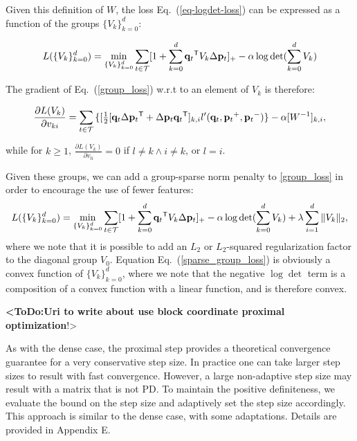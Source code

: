 \documentclass[twoside,11pt]{article}
\newcommand\todo[1]{\textbf{<ToDo:#1}!>}
\newcommand\mat[1]{{#1}}
\renewcommand\vec[1]{\mathbf{#1}}
\newcommand{\T}{{}^\mathsf{T}}
\newcommand{\W}{\mat{W}}
\newcommand{\q}{{\vec{q}}}
\newcommand{\p}{{\vec{p}}}
\newcommand{\trip}{{t}}
\newcommand{\qt}{{\q_{\trip}}}
\newcommand{\pt}{{\p_{\trip}}}
\newcommand{\triplet}{(\qt, \pt^{+}, \pt^{-})}
\newcommand{\Vk}{\mat{V_k}}
\newcommand{\Vg}{\{\Vk\}_{k=0}^{d}} %
\renewcommand{\eqref}[1]{Eq.~(\ref{#1})}
\begin{document}


Given this definition of $\W$, the loss \eqref{eq-logdet-loss} can be expressed as a function of the groups $\Vg$:

\begin{equation}
L(\Vg) = 
  \min_{\Vg} \sum_{\trip \in \cal{T}}  [1+\sum_{k=0}^{d}{\qt\T \Vk\Delta \vec{p}_t } ]_{+} - \alpha \log \det(\sum_{k=0}^{d}{\Vk})
  \label{group_loss}
\end{equation} 

The gradient of \eqref{group_loss} w.r.t to an element of $\mat{V}_k$ is therefore:

\begin{equation}
  \frac{\partial {L (V_k)}}{\partial v_{ki}} = \sum\limits_{t\in \cal{T}}{\{
  [\tfrac{1}{2}[\q_{t}\Delta\p_{t}\T + \Delta\p_{t}\q_{t}\T]_{k,i}  }
  {l'}\triplet\} - \alpha [\W^{-1}]_{k,i},
  \label{grad_group}
\end{equation}

while for $k \geq 1$, $\frac{\partial {L (V_k)}}{\partial v_{li}}=0$ if  $l \neq k \wedge i \neq k$, or $l=i$.

Given these groups, we can add a group-sparse norm penalty to  \ref{group_loss} in order to encourage the use of fewer features:
\begin{equation}
L(\Vg) = 
  \min_{\Vg} \sum_{\trip \in \cal{T}}  [1+\sum_{k=0}^{d}{\qt\T \Vk\Delta \vec{p}_t } ]_{+} - \alpha \log \det(\sum_{k=0}^{d}{\Vk}) + \lambda \sum_{i=1}^d \|V_k\|_2,
  \label{sparse_group_loss}
\end{equation} 
where we note that it is possible to add an $L_2$ or $L_2$-squared regularization factor to the diagonal group $V_0$. Equation \eqref{sparse_group_loss} is obviously a convex function of $\Vg$, where we note that the negative $\log \det$ term is a composition of a convex function with a linear function, and is therefore convex.

\todo{Uri to write about use block coordinate proximal optimization}

As with the dense case, the proximal step provides a theoretical convergence guarantee for a very conservative step size. In practice one can take larger step sizes to result with fast convergence. However, a large non-adaptive step size may result with a matrix that is not PD. To maintain the positive definiteness, we evaluate the bound on the step size and adaptively set the step size accordingly. This approach is similar to the dense case, with some adaptations. Details are provided in Appendix E. 
\end{document}

